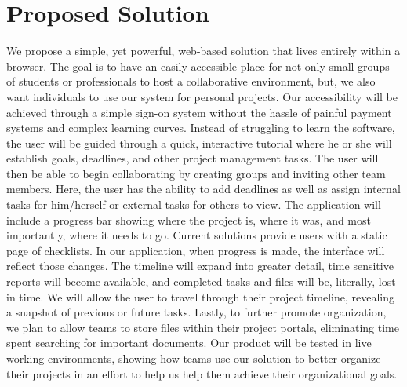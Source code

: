 \section{Proposed Solution}

We propose a simple, yet powerful, web-based solution that lives entirely within a browser. The goal is to have an easily accessible place for not only small groups of students or professionals to host a collaborative environment, but, we also want individuals to use our system for personal projects. Our accessibility will be achieved through a simple sign-on system without the hassle of painful payment systems and complex learning curves. Instead of struggling to learn the software, the user will be guided through a quick, interactive tutorial where he or she will establish goals, deadlines, and other project management tasks. The user will then be able to begin collaborating by creating groups and inviting other team members. Here, the user has the ability to add deadlines as well as assign internal tasks for him/herself or external tasks for others to view. The application will include a progress bar showing where the project is, where it was, and most importantly, where it needs to go. Current solutions provide users with a static page of checklists. In our application, when progress is made, the interface will reflect those changes. The timeline will expand into greater detail, time sensitive reports will become available, and completed tasks and files will be, literally, lost in time.  We will allow the user to travel through their project timeline, revealing a snapshot of previous or future tasks. Lastly, to further promote organization, we plan to allow teams to store files within their project portals, eliminating time spent searching for important documents. Our product will be tested in live working environments, showing how teams use our solution to better organize their projects in an effort to help us help them achieve their organizational goals. 

